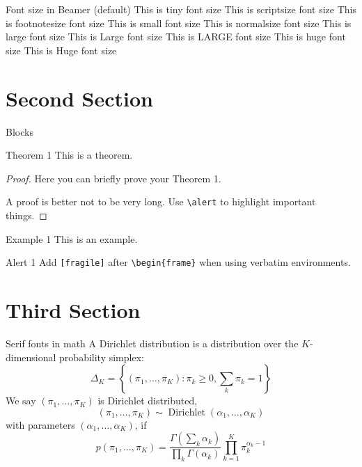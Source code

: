 \documentclass{beamer}
\begin{document}
	\begin{frame}{Font size in Beamer (default)}
		\tiny This is tiny font size
		\scriptsize This is scriptsize font size
		\footnotesize This is footnotesize font size
		\small This is small font size
		\normalsize This is normalsize font size
		\large This is large font size
		\Large This is Large font size
		\LARGE This is LARGE font size
		\huge This is huge font size
		\Huge This is Huge font size
	\end{frame}

	\section{Second Section}
	\begin{frame}[fragile]{Blocks}
		\begin{block}{Theorem 1}
			This is a theorem.
		\end{block}
		\begin{proof}
			Here you can briefly prove your Theorem 1.
			
			A proof is better not to be very long. Use \verb|\alert| to highlight \alert{important things}.
		\end{proof}
		
		\begin{exampleblock}{Example 1}
			This is an example.
		\end{exampleblock}
		
		\begin{alertblock}{Alert 1}
			Add \verb|[fragile]| after \verb|\begin{frame}| when using verbatim environments.
		\end{alertblock}
	\end{frame}

	\section{Third Section}
	\begin{frame}{Serif fonts in math}
		A Dirichlet distribution is a distribution over the $K$-dimensional probability simplex:
		$$
		\Delta_K=\left\{\left(\pi_1, \ldots, \pi_K\right): \pi_k \geq 0, \sum_k \pi_k=1\right\}
		$$
		We say $\left(\pi_1, \ldots, \pi_K\right)$ is Dirichlet distributed,
		$$
		\left(\pi_1, \ldots, \pi_K\right) \sim \operatorname{Dirichlet}\left(\alpha_1, \ldots, \alpha_K\right)
		$$
		with parameters $\left(\alpha_1, \ldots, \alpha_K\right)$, if
		$$
		p\left(\pi_1, \ldots, \pi_K\right)=\frac{\Gamma\left(\sum_k \alpha_k\right)}{\prod_k \Gamma\left(\alpha_k\right)} \prod_{k=1}^K \pi_k^{\alpha_k-1}
		$$
	\end{frame}
\end{document}
